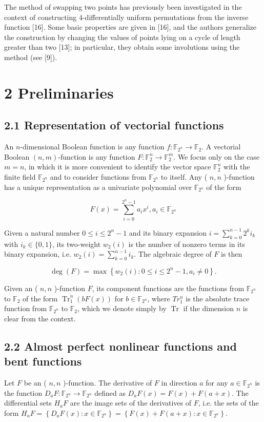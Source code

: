 \documentclass[10pt]{article}
\begin{document}
The method of swapping two points has previously been investigated in the context of constructing 4-differentially uniform permutations from the inverse function [16]. Some basic properties are given in [16], and the authors generalize the construction by changing the values of points lying on a cycle of length greater than two [13]; in particular, they obtain some involutions using the method (see [9]).

\section*{2 Preliminaries}
\subsection*{2.1 Representation of vectorial functions}
An $n$-dimensional Boolean function is any function $f: \mathbb{F}_{2^{n}} \rightarrow \mathbb{F}_{2}$. A vectorial Boolean $(n, m)$-function is any function $F: \mathbb{F}_{2}^{n} \rightarrow \mathbb{F}_{2}^{m}$. We focus only on the case $m=n$, in which it is more convenient to identify the vector space $\mathbb{F}_{2}^{n}$ with the finite field $\mathbb{F}_{2^{n}}$ and to consider functions from $\mathbb{F}_{2^{n}}$ to itself. Any ( $n, n$ )-function has a unique representation as a univariate polynomial over $\mathbb{F}_{2^{n}}$ of the form

$$
F(x)=\sum_{i=0}^{2^{n}-1} a_{i} x^{i}, a_{i} \in \mathbb{F}_{2^{n}}
$$

Given a natural number $0 \leq i \leq 2^{n}-1$ and its binary expansion $i=\sum_{k=0}^{n-1} 2^{k} i_{k}$ with $i_{k} \in\{0,1\}$, its two-weight $w_{2}(i)$ is the number of nonzero terms in its binary expansion, i.e. $w_{2}(i)=\sum_{k=0}^{n-1} i_{k}$. The algebraic degree of $F$ is then

$$
\operatorname{deg}(F)=\max \left\{w_{2}(i): 0 \leq i \leq 2^{n}-1, a_{i} \neq 0\right\} .
$$

Given an ( $n, n$ )-function $F$, its component functions are the functions from $\mathbb{F}_{2^{n}}$ to $\mathbb{F}_{2}$ of the form $\operatorname{Tr}_{1}^{n}(b F(x))$ for $b \in \mathbb{F}_{2^{n}}$, where $T r_{1}^{n}$ is the absolute trace function from $\mathbb{F}_{2^{n}}$ to $\mathbb{F}_{2}$, which we denote simply by $\operatorname{Tr}$ if the dimension $n$ is clear from the context.

\subsection*{2.2 Almost perfect nonlinear functions and bent functions}
Let $F$ be an ( $n, n$ )-function. The derivative of $F$ in direction $a$ for any $a \in \mathbb{F}_{2^{n}}$ is the function $D_{a} F: \mathbb{F}_{2^{n}} \rightarrow \mathbb{F}_{2^{n}}$ defined as $D_{a} F(x)=F(x)+F(a+x)$. The differential sets $H_{a} F$ are the image sets of the derivatives of $F$, i.e. the sets of the form $H_{a} F=\left\{D_{a} F(x):\right. \left.x \in \mathbb{F}_{2^{n}}\right\}=\left\{F(x)+F(a+x): x \in \mathbb{F}_{2^{n}}\right\}$.
\end{document}
